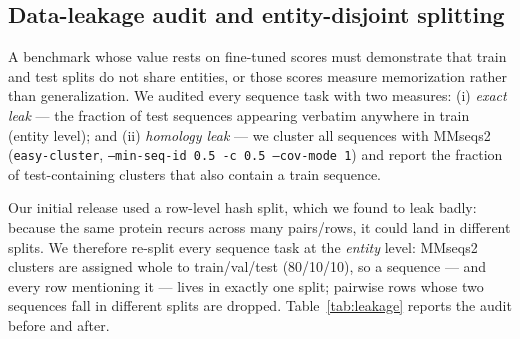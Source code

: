 
\subsection{Data-leakage audit and entity-disjoint splitting}
\label{sec:biopaws2_leakage}

A benchmark whose value rests on fine-tuned scores must demonstrate that train and test
splits do not share entities, or those scores measure memorization rather than
generalization. We audited every sequence task with two measures: (i) \emph{exact leak} ---
the fraction of test sequences appearing verbatim anywhere in train (entity level); and (ii)
\emph{homology leak} --- we cluster all sequences with MMseqs2 \citep{steinegger2017mmseqs2}
(\texttt{easy-cluster}, \texttt{--min-seq-id 0.5 -c 0.5 --cov-mode 1}) and report the
fraction of test-containing clusters that also contain a train sequence.

Our initial release used a row-level hash split, which we found to leak badly: because the
same protein recurs across many pairs/rows, it could land in different splits. We therefore
re-split every sequence task at the \emph{entity} level: MMseqs2 clusters are assigned whole
to train/val/test (80/10/10), so a sequence --- and every row mentioning it --- lives in
exactly one split; pairwise rows whose two sequences fall in different splits are dropped.
Table~\ref{tab:leakage} reports the audit before and after.

